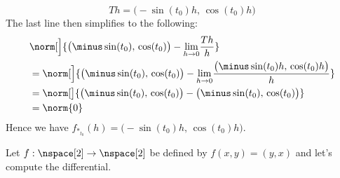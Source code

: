 \documentclass{book}                                                            %
\begin{document}
\begin{example}
\begin{equation}
                        Th=\big(\minus\sin(t_{0})h,\,\cos(t_{0})h\big)
                    \end{equation}
                    The last line then simplifies to the following:
                    \begin{subequations}
                        \begin{align}
                            \nonumber&\norm[\Big]{%
                                \big(\minus\sin(t_{0}),\,\cos(t_{0})\big)-
                                \underset{h\rightarrow{0}}{\lim}\frac{Th}{h}
                            }\\
                            &=\norm[\Big]{%
                                \big(\minus\sin(t_{0}),\,\cos(t_{0})\big)-
                                \underset{h\rightarrow{0}}{\lim}
                                \frac{%
                                    \big(\minus\sin(t_{0})h,\,\cos(t_{0})h\big)
                                }{h}
                            }\\
                            &=\norm[\big]{%
                                \big(\minus\sin(t_{0}),\,\cos(t_{0})\big)-
                                \big(\minus\sin(t_{0}),\,\cos(t_{0})\big)
                            }\\
                            &=\norm{0}
                        \end{align}
                    \end{subequations}
                    Hence we have
                    $f_{*_{t_{0}}}(h)=\big(\minus\sin(t_{0})h,\,\cos(t_{0})h\big)$.
                \end{example}
                \begin{example}
                    Let $f:\nspace[2]\rightarrow\nspace[2]$ be defined by
                    $f(x,y)=(y,x)$ and let's compute the differential.
                \end{example}
\end{document}
